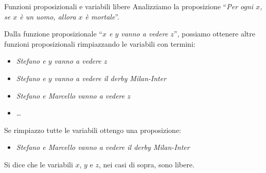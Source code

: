 \documentclass[aspectratio=169,10pt,dvipsnames,handout]{beamer}
\begin{document}
\begin{frame}{Funzioni proposizionali e variabili libere}
	Analizziamo la proposizione ``{\itshape Per ogni $x$, se $x$ è un uomo, allora $x$ è mortale}''.

	\medskip

	\pause
	\medskip
	Dalla funzione proposizionale ``{\itshape $x$ e $y$ vanno a vedere $z$}'', possiamo ottenere altre funzioni proposizionali rimpiazzando le variabili con termini:
	\begin{itemize}
		\item {\itshape Stefano e $y$ vanno a vedere $z$}
		\item {\itshape Stefano e $y$ vanno a vedere il derby Milan-Inter}
		\item {\itshape Stefano e Marcello vanno a vedere $z$}
		\item \ldots
	\end{itemize}
	Se rimpiazzo tutte le variabili ottengo una proposizione:
	\begin{itemize}
		\item {\itshape Stefano e Marcello vanno a vedere  il derby Milan-Inter}
	\end{itemize}
	Si dice che le variabili $x$, $y$ e $z$, nei casi di sopra, sono \alert{libere}.
\end{frame}
\end{document}
